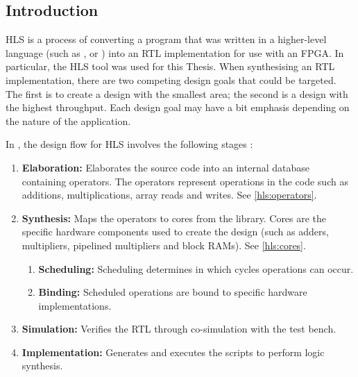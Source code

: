 \subsection{Introduction}
\label{hls:introduction}
\nocite{Xilinx:Tutorial}
\gls{HLS} is a process of converting a program that was written in a
higher-level language (such as ,
 or ) into an \gls{RTL}
implementation for use with an \gls{FPGA}. In particular, the \gls{HLS} tool
 was used for this Thesis. When synthesising an \gls{RTL}
implementation, there are two competing design goals that could be targeted. The
first is to create a design with the smallest area; the second is a design with
the highest throughput. Each design goal may have a bit emphasis depending on
the nature of the application.

In , the design flow for \gls{HLS} involves the following
stages \cite{Xilinx:Tutorial}:
\begin{enumerate}
    \item \textbf{Elaboration:} Elaborates the source code into an internal
        database containing operators. The operators represent operations in the
         code such as additions, multiplications, array
        reads and writes. See \autoref{hls:operators}.
    \item \textbf{Synthesis:} Maps the operators to cores from the
         library. Cores are the specific hardware components
        used to create the design (such as adders, multipliers, pipelined
        multipliers and block \glspl{RAM}). See \autoref{hls:cores}.
    \begin{enumerate}
        \item \textbf{Scheduling:} Scheduling determines in which cycles
            operations can occur.
        \item \textbf{Binding:} Scheduled operations are bound to specific
            hardware implementations.
    \end{enumerate}
    \item \textbf{Simulation:} Verifies the \gls{RTL} through co-simulation with
        the  test bench.
    \item \textbf{Implementation:} Generates and executes the scripts to perform
        logic synthesis.
\end{enumerate}

